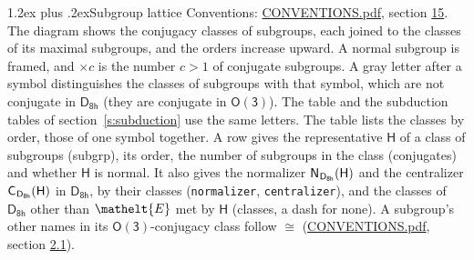 \documentclass[10pt,a4paper]{article}
\makeatletter
\renewcommand\section{\@startsection{section}{1}{\z@}{-3ex plus -1ex minus -.2ex}%
  {1.2ex plus .2ex}{\normalfont\large\sffamily\bfseries\color{parttitle}}}
\numberwithin{equation}{section}
\newcommand{\eltfont}[1]{{\let\sigma\eltsigma\mathelt{#1}}}
\newcommand{\grp}[1]{\mathsf{#1}}
\newcommand{\cls}[1]{\eltfont{#1}}
\newcommand{\samecls}{\cong}
\newcommand{\hairsp}{\mkern1mu}
\makeatother
\begin{document}
\section{Subgroup lattice}\label{s:subgroups}
Conventions: \href{../../CONVENTIONS.pdf}{CONVENTIONS.pdf}, section \href{../../CONVENTIONS.pdf\#conv.15}{15}.
The diagram shows the conjugacy classes of subgroups, each joined to the classes of its maximal subgroups, and the orders increase upward. A normal subgroup is framed, and ${\times}c$ is the number $c > 1$ of conjugate subgroups. A gray letter after a symbol distinguishes the classes of subgroups with that symbol, which are not conjugate in $\grp{D_{8h}}$ (they are conjugate in \href{O3.pdf}{$\grp{O(3)}$}). The table and the subduction tables of section~\ref{s:subduction} use the same letters. The table lists the classes by order, those of one symbol together. \label{n:group.H}\label{n:head.subgroup}\label{n:head.order}\label{n:head.conjugates}\label{n:head.normal}A row gives the representative $\grp{H}$ of a class of subgroups (subgrp), its order, the number of subgroups in the class (conjugates) and whether $\grp{H}$ is normal. \label{n:group.normalizer}\label{n:group.centralizer}\label{n:head.classes}It also gives the normalizer $\grp{N}_{\hairsp \grp{D_{8h}}}(\grp{H})$ and the centralizer $\grp{C}_{\hairsp \grp{D_{8h}}}(\grp{H})$ in $\grp{D_{8h}}$, by their classes (\texttt{normalizer}, \texttt{centralizer}), and the classes of $\grp{D_{8h}}$ other than $\cls{E}$ met by $\grp{H}$ (classes, a dash for none). A subgroup's other names in its \href{O3.pdf}{$\grp{O(3)}$}-conjugacy class follow $\samecls$ (\href{../../CONVENTIONS.pdf}{CONVENTIONS.pdf}, section \href{../../CONVENTIONS.pdf\#conv.2.1}{2.1}).
\end{document}
